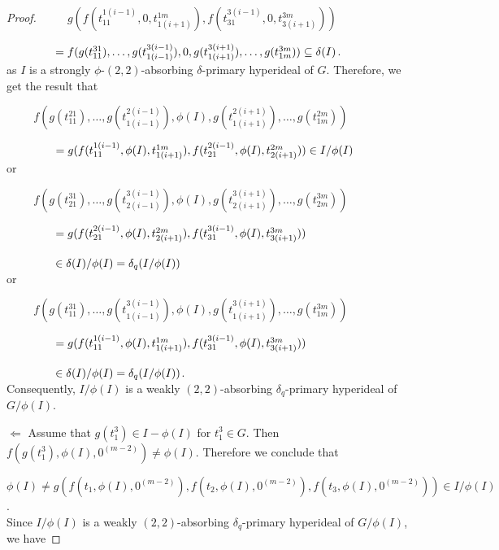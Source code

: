 \documentclass[preprint,review,10pt]{amsart}
\theoremstyle{definition}
\theoremstyle{remark}
\numberwithin{equation}{section}
\begin{document}
\begin{proof}
$\hspace{1cm}g(f(t_{11}^{1(i-1)},0,t_{1(i+1)}^{1m}),f(t_{31}^{3(i-1)},0,t_{3(i+1)}^{3m}))$

$\hspace{1.5cm}=f(g(t_{11}^{31}),\ldots,g(t_{1(i-1)}^{3(i-1)}),0,g(t_{1(i+1)}^{3(i+1)}),\ldots,g(t_{1m}^{3m}))\subseteq \delta(I)$.\\ 
as $I$ is a strongly $\phi$-$(2,2)$-absorbing $\delta$-primary hyperideal of $G$. Therefore, we get the result that 

$\hspace{1cm}f(g(t_{11}^{21}),\ldots,g(t_{1(i-1)}^{2(i-1)}),\phi(I),g(t_{1(i+1)}^{2(i+1)}),\ldots,g(t_{1m}^{2m}))$


$\hspace{1.5cm}=g(f(t_{11}^{1(i-1)},\phi(I),t_{1(i+1)}^{1m}),f(t_{21}^{2(i-1)},\phi(I),t_{2(i+1)}^{2m}))\in I/\phi(I)$\\ or  

$\hspace{1cm}f(g(t_{21}^{31}),\ldots,g(t_{2(i-1)}^{3(i-1)}),\phi(I),g(t_{2(i+1)}^{3(i+1)}),\ldots,g(t_{2m}^{3m}))$

$\hspace{1.5cm}=g(f(t_{21}^{2(i-1)},\phi(I),t_{2(i+1)}^{2m}),f(t_{31}^{3(i-1)},\phi(I),t_{3(i+1)}^{3m}))$

$\hspace{1.5cm}\in \delta(I)/\phi(I)=\delta_q(I/\phi(I))$\\
or 

$\hspace{1cm}f(g(t_{11}^{31}),\ldots,g(t_{1(i-1)}^{3(i-1)}),\phi(I),g(t_{1(i+1)}^{3(i+1)}),\ldots,g(t_{1m}^{3m}))$

$\hspace{1.5cm}=g(f(t_{11}^{1(i-1)},\phi(I),t_{1(i+1)}^{1m}),f(t_{31}^{3(i-1)},\phi(I),t_{3(i+1)}^{3m}))$

$ \hspace{1.5cm} \in \delta(I)/\phi(I)=\delta_q(I/\phi(I))$.\\
Consequently, $I/\phi(I)$ is a  weakly $(2,2)$-absorbing $\delta_q$-primary hyperideal of $G/\phi(I)$. 

$\Longleftarrow $ Assume that  $g(t_1^3) \in I-\phi(I)$ for  $t_1^3 \in G$. Then $f(g(t_1^3),\phi(I),0^{(m-2)}) \neq \phi(I)$. Therefore we conclude that

$\phi(I) \neq g(f(t_1,\phi(I),0^{(m-2)}),f(t_2,\phi(I),0^{(m-2)}),f(t_3,\phi(I),0^{(m-2)})) \in I/\phi(I)$. \\
 Since $I/\phi(I)$ is a  weakly $(2,2)$-absorbing $\delta_q$-primary hyperideal of $G/\phi(I)$, we have 
 

\end{proof}
\end{document}

